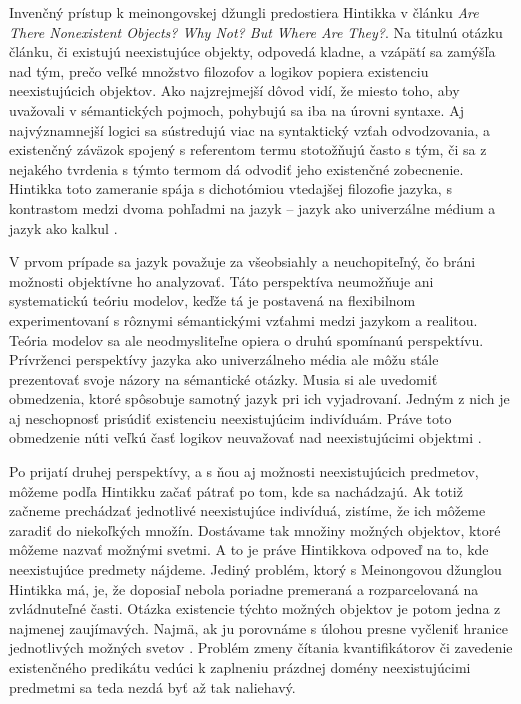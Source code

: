 \documentclass[12pt, letterpaper]{article}
\begin{document}
Invenčný prístup k meinongovskej džungli predostiera Hintikka v článku \textit{Are There Nonexistent Objects? Why Not? But Where Are They?}. Na titulnú otázku článku, či existujú neexistujúce objekty, odpovedá kladne, a vzápätí sa zamýšľa nad tým, prečo veľké množstvo filozofov a logikov popiera existenciu neexistujúcich objektov. Ako najzrejmejší dôvod vidí, že miesto toho, aby uvažovali v sémantických pojmoch, pohybujú sa iba na úrovni syntaxe. Aj najvýznamnejší logici sa sústredujú viac na syntaktický vzťah odvodzovania, a existenčný záväzok spojený s referentom termu stotožňujú často s tým, či sa z nejakého tvrdenia s týmto termom dá odvodiť jeho existenčné zobecnenie. Hintikka toto zameranie spája s dichotómiou vtedajšej filozofie jazyka, s kontrastom medzi dvoma pohľadmi na jazyk -- jazyk ako univerzálne médium a jazyk ako kalkul \parencites[451--453]{Hintikka}.\par
V prvom prípade sa jazyk považuje za všeobsiahly a neuchopiteľný, čo bráni možnosti objektívne ho analyzovať. Táto perspektíva neumožňuje ani systematickú teóriu modelov, keďže tá je postavená na flexibilnom experimentovaní s rôznymi sémantickými vzťahmi medzi jazykom a realitou. Teória modelov sa ale neodmysliteľne opiera o druhú spomínanú perspektívu. Prívrženci perspektívy jazyka ako univerzálneho média ale môžu stále prezentovať svoje názory na sémantické otázky. Musia si ale uvedomiť obmedzenia, ktoré spôsobuje samotný jazyk pri ich vyjadrovaní. Jedným z nich je aj neschopnosť prisúdiť existenciu neexistujúcim indivíduám. Práve toto obmedzenie núti veľkú časť logikov neuvažovať nad neexistujúcimi objektmi \parencites[453--454]{Hintikka}.\par
Po prijatí druhej perspektívy, a s ňou aj možnosti neexistujúcich predmetov, môžeme podľa Hintikku začať pátrať po tom, kde sa nachádzajú. Ak totiž začneme prechádzať jednotlivé neexistujúce indivíduá, zistíme, že ich môžeme zaradiť do niekoľkých množín. Dostávame tak množiny možných objektov, ktoré môžeme nazvať možnými svetmi. A to je práve Hintikkova odpoveď na to, kde neexistujúce predmety nájdeme. Jediný problém, ktorý s Meinongovou džunglou Hintikka má, je, že doposiaľ nebola poriadne premeraná a rozparcelovaná na zvládnuteľné časti. Otázka existencie týchto možných objektov je potom jedna z najmenej zaujímavých. Najmä, ak ju porovnáme s úlohou presne vyčleniť hranice jednotlivých možných svetov \parencites[454--455]{Hintikka}. Problém zmeny čítania kvantifikátorov či zavedenie existenčného predikátu vedúci k zaplneniu prázdnej domény neexistujúcimi predmetmi sa teda nezdá byť až tak naliehavý.
\end{document}
